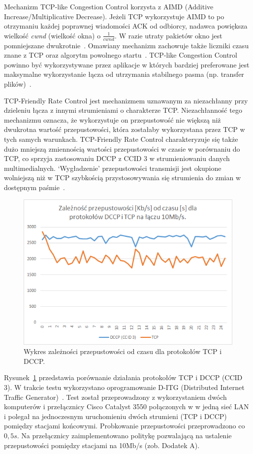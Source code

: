 Mechanizm TCP-like Congestion Control korzysta z AIMD (Additive Increase/Multiplicative Decrease). Jeżeli TCP wykorzystuje AIMD to po otrzymaniu każdej poprawnej wiadomości ACK od odbiorcy, nadawca powiększa wielkość \textit{cwnd} (wielkość okna) o $\frac{1}{cwnd}$. W razie utraty pakietów okno jest pomniejszane dwukrotnie~\cite{Stevens}. Omawiany mechanizm zachowuje także liczniki czasu znane z TCP oraz algorytm powolnego startu~\cite{RFC2581}. TCP-like Congestion Control powinno być wykorzystywane przez aplikacje w których bardziej preferowane jest maksymalne wykorzystanie łącza od utrzymania stabilnego pasma (np. transfer plików)~\cite{RFC4341}.

TCP-Friendly Rate Control jest mechanizmem uznawanym za niezachłanny przy dzieleniu łącza z innymi strumieniami o charakterze TCP. Niezachłanność tego mechanizmu oznacza, że wykorzystuje on przepustowość nie większą niż dwukrotna wartość przepustowości, która zostałaby wykorzystana przez TCP w tych samych warunkach. TCP-Friendly Rate Control charakteryzuje się także dużo mniejszą zmiennością wartości przepustowości w czasie w porównaniu do TCP, co sprzyja zastosowaniu DCCP z CCID 3 w strumieniowaniu danych multimedialnych. `Wygładzenie' przepustowości transmisji jest okupione wolniejszą niż w TCP szybkością przystosowywania się strumienia do zmian w dostępnym paśmie~\cite{RFC5348}.


\begin{figure}[h!]
	\centering
		\includegraphics{TCP_DCCP}
	\caption{Wykres zależności przepustowości od czasu dla protokołów TCP i DCCP.}
	\label{TCP_DCCP}
\end{figure}

Rysunek~\ref{TCP_DCCP} przedstawia porównanie działania protokołów TCP i DCCP (CCID 3). W trakcie testu wykorzystano oprogramowanie D-ITG (Distributed Internet Traffic Generator)~\cite{D-ITG}. Test został przeprowadzony z wykorzystaniem dwóch komputerów i przełącznicy Cisco Catalyst 3550 połączonych w w jedną sieć LAN i polegał na jednoczesnym uruchomieniu dwóch strumieni (TCP i DCCP) pomiędzy stacjami końcowymi. Probkowanie przepustowości przeprowadzono co $0,5s$. Na przełącznicy zaimplementowano politykę pozwalającą na ustalenie przepustowości pomiędzy stacjami na 10Mb/s (zob. Dodatek A).


